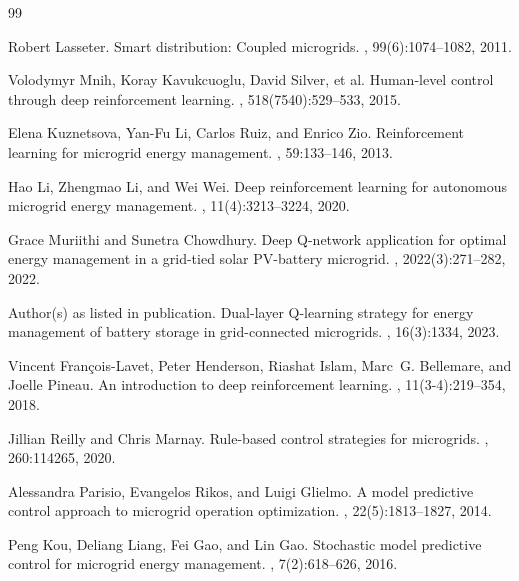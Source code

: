 \documentclass[11pt,a4paper]{article}
\begin{document}
\begin{thebibliography}{99}

Robert Lasseter.
\newblock Smart distribution: Coupled microgrids.
, 99(6):1074--1082, 2011.

Volodymyr Mnih, Koray Kavukcuoglu, David Silver, et al.
\newblock Human-level control through deep reinforcement learning.
, 518(7540):529--533, 2015.

Elena Kuznetsova, Yan-Fu Li, Carlos Ruiz, and Enrico Zio.
\newblock Reinforcement learning for microgrid energy management.
, 59:133--146, 2013.

Hao Li, Zhengmao Li, and Wei Wei.
\newblock Deep reinforcement learning for autonomous microgrid energy management.
, 11(4):3213--3224, 2020.

Grace Muriithi and Sunetra Chowdhury.
\newblock Deep Q-network application for optimal energy management in a grid-tied solar PV-battery microgrid.
, 2022(3):271--282, 2022.

Author(s) as listed in publication.
\newblock Dual-layer Q-learning strategy for energy management of battery storage in grid-connected microgrids.
, 16(3):1334, 2023.

Vincent Fran\c{c}ois-Lavet, Peter Henderson, Riashat Islam, Marc~G. Bellemare, and Joelle Pineau.
\newblock An introduction to deep reinforcement learning.
, 11(3-4):219--354, 2018.

Jillian Reilly and Chris Marnay.
\newblock Rule-based control strategies for microgrids.
, 260:114265, 2020.

Alessandra Parisio, Evangelos Rikos, and Luigi Glielmo.
\newblock A model predictive control approach to microgrid operation optimization.
, 22(5):1813--1827, 2014.

Peng Kou, Deliang Liang, Fei Gao, and Lin Gao.
\newblock Stochastic model predictive control for microgrid energy management.
, 7(2):618--626, 2016.


\end{thebibliography}
\end{document}
